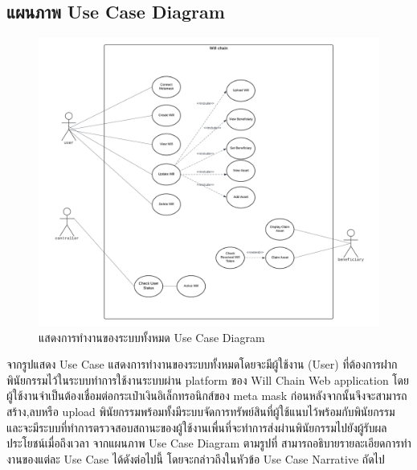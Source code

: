 \documentclass[12pt,oneside,openright,a4paper]{cpe-thai-project}
\begin{document}
\subsection{แผนภาพ Use Case Diagram}
	\begin{figure}[!htb]
		\centering
		\includegraphics[scale=0.5]{UseCaseDiagram}
		\caption{แสดงการทำงานของระบบทั้งหมด Use Case Diagram}
	\end{figure}
\FloatBarrier
\tab จากรูปแสดง Use Case แสดงการทำงานของระบบทั้งหมดโดยจะมีผู้ใช้งาน (User) ที่ต้องการฝากพินัยกรรมไว้ในระบบทำการใช้งานระบบผ่าน platform ของ Will Chain Web application  โดยผู้ใช้งานจำเป็นต้องเชื่อมต่อกระเป๋าเงินอิเล็กทรอนิกส์ของ meta mask ก่อนหลังจากนั้นจึงจะสามารถ สร้าง,ลบหรือ upload พินัยกรรมพร้อมทั้งมีระบบจัดการทรัพย์สินที่ผู้ใช้แนบไว้พร้อมกับพินัยกรรม และจะมีระบบที่ทำการตรวจสอบสถานะของผู้ใช้งานเพื่นที่จะทำการส่งผ่านพินัยกรรมไปยังผู้รับผลประโยชน์เมื่อถึงเวลา   จากแผนภาพ Use Case Diagram ตามรูปที่ สามารถอธิบายรายละเอียดการทํา งานของแต่ละ Use Case ได้ดังต่อไปนี้ โดยจะกล่าวถึงในหัวข้อ Use Case Narrative ถัดไป
\clearpage
\end{document}
